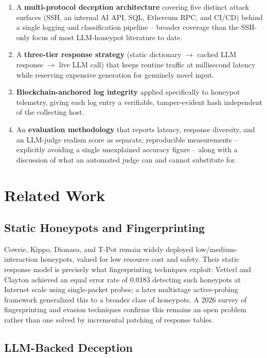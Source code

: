 \documentclass[conference]{IEEEtran}
\begin{document}
\begin{enumerate}
\item A \textbf{multi-protocol deception architecture} covering five distinct
attack surfaces (SSH, an internal AI API, SQL, Ethereum RPC, and CI/CD) behind
a single logging and classification pipeline -- broader coverage than the
SSH-only focus of most LLM-honeypot literature to date.
\item A \textbf{three-tier response strategy} (static dictionary
$\rightarrow$ cached LLM response $\rightarrow$ live LLM call) that keeps
routine traffic at millisecond latency while reserving expensive generation
for genuinely novel input.
\item \textbf{Blockchain-anchored log integrity} applied specifically to
honeypot telemetry, giving each log entry a verifiable, tamper-evident hash
independent of the collecting host.
\item An \textbf{evaluation methodology} that reports latency, response
diversity, and an LLM-judge realism score as separate, reproducible
measurements -- explicitly avoiding a single unexplained accuracy figure --
along with a discussion of what an automated judge can and cannot substitute
for.
\end{enumerate}

\section{Related Work}

\subsection{Static Honeypots and Fingerprinting}

Cowrie, Kippo, Dionaea, and T-Pot remain widely deployed low/medium-interaction
honeypots, valued for low resource cost and safety. Their static response
model is precisely what fingerprinting techniques exploit: Vetterl and Clayton
\cite{vetterl2018bitter} achieved an equal error rate of 0.0183 detecting such
honeypots at Internet scale using single-packet probes; a later multistage
active-probing framework \cite{gotcha2023} generalized this to a broader class
of honeypots. A 2026 survey of fingerprinting and evasion techniques
\cite{honeypotsurvey2026} confirms this remains an open problem rather than
one solved by incremental patching of response tables.

\subsection{LLM-Backed Deception}
\end{document}
